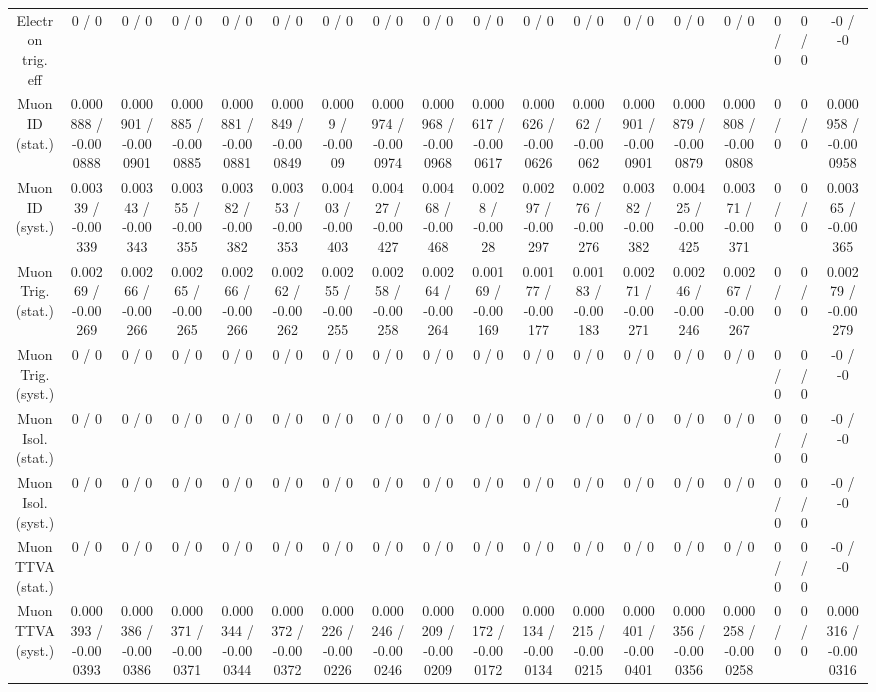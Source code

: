 \documentclass[10pt]{article}
\begin{document}
\begin{table}[htbp]
\begin{center}
\begin{tabular}{|c|c|c|c|c|c|c|c|c|c|c|c|c|c|c|c|c|c|}
  Electron trig. eff & 0 / 0 & 0 / 0 & 0 / 0 & 0 / 0 & 0 / 0 & 0 / 0 & 0 / 0 & 0 / 0 & 0 / 0 & 0 / 0 & 0 / 0 & 0 / 0 & 0 / 0 & 0 / 0 & 0 / 0 & 0 / 0 & -0 / -0 \\ 
  Muon ID (stat.) & 0.000888 / -0.000888 & 0.000901 / -0.000901 & 0.000885 / -0.000885 & 0.000881 / -0.000881 & 0.000849 / -0.000849 & 0.0009 / -0.0009 & 0.000974 / -0.000974 & 0.000968 / -0.000968 & 0.000617 / -0.000617 & 0.000626 / -0.000626 & 0.00062 / -0.00062 & 0.000901 / -0.000901 & 0.000879 / -0.000879 & 0.000808 / -0.000808 & 0 / 0 & 0 / 0 & 0.000958 / -0.000958 \\ 
  Muon ID (syst.) & 0.00339 / -0.00339 & 0.00343 / -0.00343 & 0.00355 / -0.00355 & 0.00382 / -0.00382 & 0.00353 / -0.00353 & 0.00403 / -0.00403 & 0.00427 / -0.00427 & 0.00468 / -0.00468 & 0.0028 / -0.0028 & 0.00297 / -0.00297 & 0.00276 / -0.00276 & 0.00382 / -0.00382 & 0.00425 / -0.00425 & 0.00371 / -0.00371 & 0 / 0 & 0 / 0 & 0.00365 / -0.00365 \\ 
  Muon Trig. (stat.) & 0.00269 / -0.00269 & 0.00266 / -0.00266 & 0.00265 / -0.00265 & 0.00266 / -0.00266 & 0.00262 / -0.00262 & 0.00255 / -0.00255 & 0.00258 / -0.00258 & 0.00264 / -0.00264 & 0.00169 / -0.00169 & 0.00177 / -0.00177 & 0.00183 / -0.00183 & 0.00271 / -0.00271 & 0.00246 / -0.00246 & 0.00267 / -0.00267 & 0 / 0 & 0 / 0 & 0.00279 / -0.00279 \\ 
  Muon Trig. (syst.) & 0 / 0 & 0 / 0 & 0 / 0 & 0 / 0 & 0 / 0 & 0 / 0 & 0 / 0 & 0 / 0 & 0 / 0 & 0 / 0 & 0 / 0 & 0 / 0 & 0 / 0 & 0 / 0 & 0 / 0 & 0 / 0 & -0 / -0 \\ 
  Muon Isol. (stat.) & 0 / 0 & 0 / 0 & 0 / 0 & 0 / 0 & 0 / 0 & 0 / 0 & 0 / 0 & 0 / 0 & 0 / 0 & 0 / 0 & 0 / 0 & 0 / 0 & 0 / 0 & 0 / 0 & 0 / 0 & 0 / 0 & -0 / -0 \\ 
  Muon Isol. (syst.) & 0 / 0 & 0 / 0 & 0 / 0 & 0 / 0 & 0 / 0 & 0 / 0 & 0 / 0 & 0 / 0 & 0 / 0 & 0 / 0 & 0 / 0 & 0 / 0 & 0 / 0 & 0 / 0 & 0 / 0 & 0 / 0 & -0 / -0 \\ 
  Muon TTVA (stat.) & 0 / 0 & 0 / 0 & 0 / 0 & 0 / 0 & 0 / 0 & 0 / 0 & 0 / 0 & 0 / 0 & 0 / 0 & 0 / 0 & 0 / 0 & 0 / 0 & 0 / 0 & 0 / 0 & 0 / 0 & 0 / 0 & -0 / -0 \\ 
  Muon TTVA (syst.) & 0.000393 / -0.000393 & 0.000386 / -0.000386 & 0.000371 / -0.000371 & 0.000344 / -0.000344 & 0.000372 / -0.000372 & 0.000226 / -0.000226 & 0.000246 / -0.000246 & 0.000209 / -0.000209 & 0.000172 / -0.000172 & 0.000134 / -0.000134 & 0.000215 / -0.000215 & 0.000401 / -0.000401 & 0.000356 / -0.000356 & 0.000258 / -0.000258 & 0 / 0 & 0 / 0 & 0.000316 / -0.000316 \\ 

\end{tabular}
\end{center}
\end{table}
\end{document}

